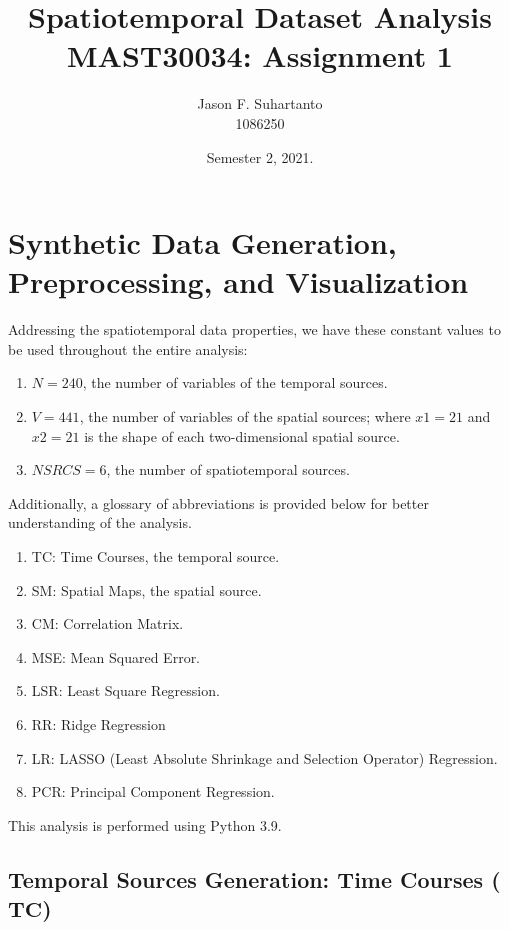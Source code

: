 \documentclass[11pt]{article}
\title{\textbf{Spatiotemporal Dataset Analysis} \\ MAST30034: Assignment 1}
\author{Jason F. Suhartanto \\ 1086250}
\date{Semester 2, 2021.}
\begin{document}
\maketitle

\section{Synthetic Data Generation, Preprocessing, and Visualization}

Addressing the spatiotemporal data properties, we have these constant values to be used throughout the entire analysis:


\begin{enumerate}
    \item $N = 240$, the number of variables of the temporal sources. 
    \item $V = 441$, the number of variables of the spatial sources; where $x1 = 21$ and $x2 = 21$ is the shape of each two-dimensional spatial source.
    \item $NSRCS = 6$, the number of spatiotemporal sources.
\end{enumerate}

Additionally, a glossary of abbreviations is provided below for better understanding of the analysis.

\begin{enumerate}
    \item TC: Time Courses, the temporal source.
    \item SM: Spatial Maps, the spatial source.
    \item CM: Correlation Matrix.
    \item MSE: Mean Squared Error.
    \item LSR: Least Square Regression.
    \item RR: Ridge Regression
    \item LR: LASSO (Least Absolute Shrinkage and Selection Operator) Regression.
    \item PCR: Principal Component Regression.
\end{enumerate}

This analysis is performed using Python 3.9.

\subsection{Temporal Sources Generation: Time Courses ($\mathbf{TC}$)}
\end{document}
